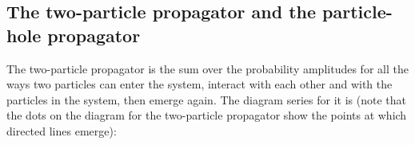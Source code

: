 \subsection{The two-particle propagator and the particle-hole propagator}
The two-particle propagator is the sum over the probability amplitudes for all the ways two particles can enter the system, interact with each other and with the particles in the system, then emerge again. The diagram series for it is (note that the dots on the diagram for the two-particle propagator show the points at which directed lines emerge):
\begin{center}
    



\begin{tikzpicture}[x=0.75pt,y=0.75pt,yscale=-1,xscale=1]


\end{tikzpicture}
\end{center}
